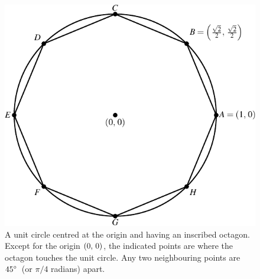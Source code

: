 \documentclass[a4paper,oneside,12pt]{article}
\begin{document}
\begin{figure}[!htbp]
\centering
\includegraphics[scale=1]{image/05/circle-octagon.pdf}
\caption{%
  A unit circle centred at the origin and having an inscribed
  octagon.  Except for the origin $\left\lparen{0},\, {0}\right\rparen$, the indicated points
  are where the octagon touches the unit circle.  Any two neighbouring
  points are ${45}^{\circ}$~(or $\pi / 4$ radians) apart.
}
\label{fig:circle_inscribed_octagon}
\end{figure}
\end{document}
